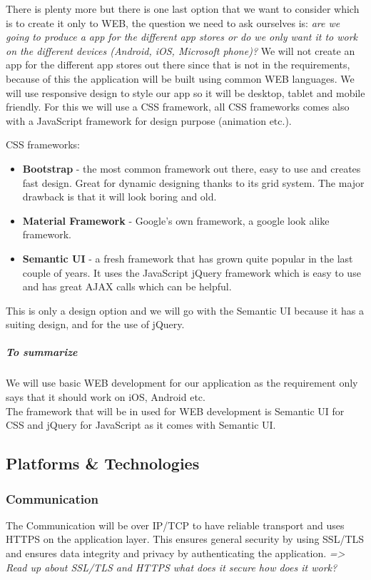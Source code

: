 \documentclass[a4paper,11pt]{article}
\begin{document}
\noindent There is plenty more but there is one last option that we want to
consider which is to create it only to WEB, the question we need to ask
ourselves is: \emph{are we going to produce a app for the different app
stores or do we only want it to work on the different devices (Android,
iOS, Microsoft phone)?} We will not create an app for the different app
stores out there since that is not in the requirements, because of this
the application will be built using common WEB languages. We will use
responsive design to style our app so it will be desktop, tablet and
mobile friendly. For this we will use a CSS framework, all CSS
frameworks comes also with a JavaScript framework for design purpose
(animation etc.).

\noindent CSS frameworks:

\begin{itemize}
\item
  \textbf{Bootstrap} - the most common framework out there, easy to use
  and creates fast design. Great for dynamic designing thanks to its
  grid system. The major drawback is that it will look boring and old.
\item
  \textbf{Material Framework} - Google's own framework, a google look
  alike framework.
\item
  \textbf{Semantic UI} - a fresh framework that has grown quite popular
  in the last couple of years. It uses the JavaScript jQuery framework
  which is easy to use and has great AJAX calls which can be helpful.
\end{itemize}

\noindent This is only a design option and we will go with the Semantic UI because
it has a suiting design, and for the use of jQuery.

\subparagraph{To summarize}\label{to-summarize}
We will use basic WEB development for our application as the requirement
only says that it should work on iOS, Android etc.\\
The framework that will be in used for WEB development is Semantic UI
for CSS and jQuery for JavaScript as it comes with Semantic UI.

\subsection{Platforms \& Technologies}

\subsubsection{Communication}
The Communication will be over IP/TCP to have reliable transport and uses HTTPS on the application layer. This ensures general security by using SSL/TLS and ensures data integrity and privacy by authenticating the application.
\textit{=> Read up about SSL/TLS and HTTPS what does it secure how does it work?}
\end{document}
